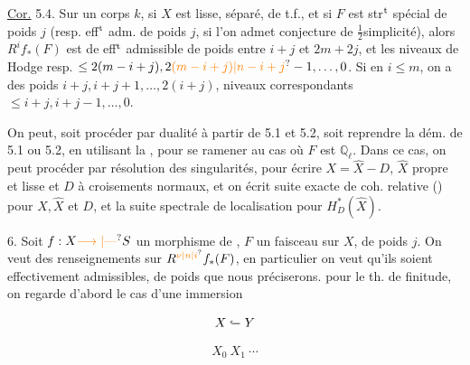 

\uline{Cor.} 5.4. Sur un corps $k$, si $X$ est lisse, séparé, de t.f., et si $F$ est  str$^{\rm t}$ spécial de poids $j$ (resp. eff$^{\rm t}$ adm. de poids $j$, si l'on admet conjecture de $\tfrac{1}{2}$simplicité), alors $R^i f_*(F)$ est de eff$^{\rm t}$ admissible de poids entre $i+j$ et $2m+2j$, et les niveaux  de Hodge resp. $\leq 2(m-i+j),2\unsure{(m-i+j)|n-i+j}-1,\ldots,0$. Si en \unsure{$+$} $i\leq m$, on a   des poids  $i+j,i+j+1,\ldots,2(i+j)$,  niveaux correspondants $\leq i+j,i+j-1,\ldots,0$.

On peut, soit procéder par dualité à partir de 5.1 et 5.2, soit reprendre  la dém. de 5.1 ou 5.2, en utilisant la  , pour se ramener au cas où $F$ est $\mathbb Q_\ell$. Dans ce cas, on peut procéder par  résolution des singularités, pour écrire $X=\widehat X-D$, $\widehat X$  propre et lisse et $D$  à croisements normaux, et on écrit suite exacte de coh. relative () pour $X,\widehat X$ et $D$, et la suite spectrale de localisation pour $H^{*}_D(\widehat X)$.


6. Soit $f:X\unsure{\longrightarrow|\text{---}}S$ un morphisme de , $F$ un faisceau   sur $X$, de poids $j$. On veut des renseignements sur  $R^{\unsure{\nu|n|i}}f_*(F)$, en particulier on veut qu'ils soient effectivement admissibles, de poids que nous préciserons.   pour le th. de finitude, on regarde d'abord le cas d'une immersion


\[ X\lhook\joinrel\relbar Y \]

\[ X_0\ X_1\ \cdots \]


